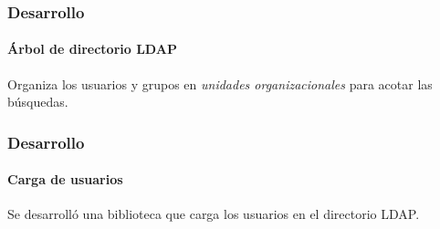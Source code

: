 \documentclass{beamer}
\begin{document}
\begin{frame}
\frametitle{Desarrollo}
\framesubtitle{\'{A}rbol de directorio \textup{LDAP}}

Organiza los usuarios y grupos en \emph{unidades organizacionales} para acotar las b\'{u}squedas.

\vspace{1.0em}

\centering
 {
  
 }

\end{frame}

%
%
%
%
%


\begin{frame}
\frametitle{Desarrollo}
\framesubtitle{Carga de usuarios}

Se desarroll\'{o} una biblioteca que carga los usuarios en el directorio \textup{LDAP}.

\vspace{1.5em}

\centering
 {
  
 }

\end{frame}
\end{document}
